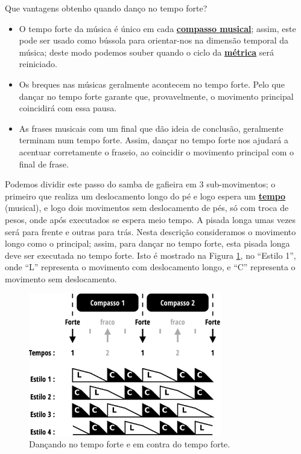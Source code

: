 \begin{tcbinformation}{Que vantagens obtenho quando danço no tempo forte?}
\label{ref:beneficiosdancarforte}
\begin{itemize}
\item O tempo forte da música é único em cada \hyperref[sec:compaso]{\textbf{compasso musical}};
assim, este pode ser usado como bússola para orientar-nos na dimensão temporal da música; deste modo
podemos souber quando o ciclo da \hyperref[def:Metrica]{\textbf{métrica}} será reiniciado.
\item Os breques nas músicas geralmente acontecem no tempo forte.
Pelo que dançar no tempo forte garante que, provavelmente, 
o movimento principal coincidirá com essa pausa.
\item As frases musicais com um final que dão ideia de conclusão,
geralmente terminam num tempo forte.
Assim, dançar no tempo forte nos ajudará a acentuar corretamente o fraseio,
ao coincidir o movimento principal com o final de frase. 
\end{itemize}
\end{tcbinformation} 

\begin{example}
\label{ex:frentetrasex}
Podemos dividir este passo do samba de gafieira em 3 sub-movimentos; 
o primeiro que realiza um deslocamento longo do pé e logo espera um \hyperref[sec:Tempo]{\textbf{tempo}} (musical),
e logo dois movimentos sem deslocamento de pés, só com troca de pesos,
 onde após executados se espera meio tempo. 
A pisada longa umas vezes será para frente e outras para trás. 
Nesta descrição consideramos o movimento longo como o principal;
assim, para dançar no tempo forte, esta pisada longa deve ser executada no tempo forte.
Isto é mostrado na Figura \ref{fig:tempovscontratempo}, no ``Estilo 1'',
onde ``L'' representa o movimento com deslocamento longo,
e ``C'' representa o movimento sem deslocamento.
\end{example}


\begin{figure}[h]
    \centering 
\includegraphics[width=0.75\textwidth]{chapters/cap-musicalidade/bailarcontratempo.eps}
    \caption{Dançando no tempo forte e em contra do tempo forte.}\label{fig:tempovscontratempo}
\end{figure}




